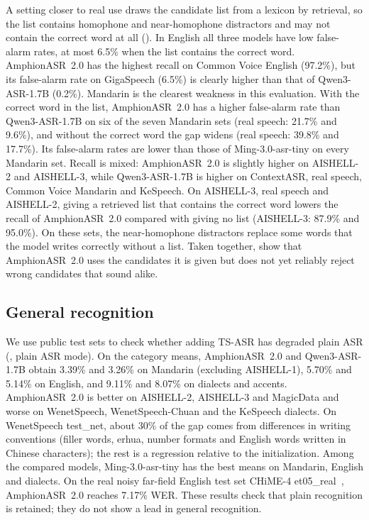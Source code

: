 A setting closer to real use draws the candidate list from a lexicon by retrieval, so the list contains homophone and near-homophone distractors and may not contain the correct word at all ().
In English all three models have low false-alarm rates, at most 6.5\% when the list contains the correct word.
AmphionASR~2.0 has the highest recall on Common Voice English (97.2\%), but its false-alarm rate on GigaSpeech (6.5\%) is clearly higher than that of Qwen3-ASR-1.7B (0.2\%).
Mandarin is the clearest weakness in this evaluation.
With the correct word in the list, AmphionASR~2.0 has a higher false-alarm rate than Qwen3-ASR-1.7B on six of the seven Mandarin sets (real speech: 21.7\% and 9.6\%), and without the correct word the gap widens (real speech: 39.8\% and 17.7\%).
Its false-alarm rates are lower than those of Ming-3.0-asr-tiny on every Mandarin set.
Recall is mixed: AmphionASR~2.0 is slightly higher on AISHELL-2 and AISHELL-3, while Qwen3-ASR-1.7B is higher on ContextASR, real speech, Common Voice Mandarin and KeSpeech.
On AISHELL-3, real speech and AISHELL-2, giving a retrieved list that contains the correct word lowers the recall of AmphionASR~2.0 compared with giving no list (AISHELL-3: 87.9\% and 95.0\%).
On these sets, the near-homophone distractors replace some words that the model writes correctly without a list.
Taken together,  show that AmphionASR~2.0 uses the candidates it is given but does not yet reliably reject wrong candidates that sound alike.



\subsection{General recognition}
\label{subsec:exp_general}

We use public test sets to check whether adding TS-ASR has degraded plain ASR (, plain ASR mode).
On the category means, AmphionASR~2.0 and Qwen3-ASR-1.7B obtain 3.39\% and 3.26\% on Mandarin (excluding AISHELL-1), 5.70\% and 5.14\% on English, and 9.11\% and 8.07\% on dialects and accents.
AmphionASR~2.0 is better on AISHELL-2, AISHELL-3 and MagicData and worse on WenetSpeech, WenetSpeech-Chuan and the KeSpeech dialects.
On WenetSpeech test\_net, about 30\% of the gap comes from differences in writing conventions (filler words, erhua, number formats and English words written in Chinese characters); the rest is a regression relative to the initialization.
Among the compared models, Ming-3.0-asr-tiny has the best means on Mandarin, English and dialects.
On the real noisy far-field English test set CHiME-4 et05\_real~\cite{vincent2017analysis}, AmphionASR~2.0 reaches 7.17\% WER.
These results check that plain recognition is retained; they do not show a lead in general recognition.



